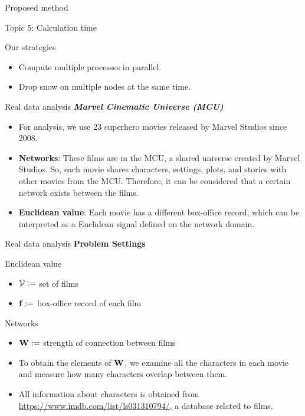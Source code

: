 \documentclass[
  ignorenonframetext,
]{beamer}
\providecommand{\tightlist}{%
  \setlength{\itemsep}{0pt}\setlength{\parskip}{0pt}}\usepackage{longtable,booktabs,array}
\begin{document}
\begin{frame}{Proposed method}
\label{proposed-method-6}
\begin{block}{Topic 5: Calculation time}
\label{topic-5-calculation-time}
\begin{block}{Our strategies}
\label{our-strategies-2}
\begin{itemize}
\tightlist
\item
  Compute multiple processes in parallel.
\item
  Drop snow on multiple nodes at the same time.
\end{itemize}
\end{block}
\end{block}
\end{frame}

\begin{frame}{Real data analysis}
\label{real-data-analysis}
\textbf{\emph{Marvel Cinematic Universe (MCU)}}

\begin{itemize}
\tightlist
\item
  For analysis, we use 23 superhero movies released by Marvel Studios
  since 2008.
\item
  \textbf{Networks}: These films are in the MCU, a shared universe
  created by Marvel Studios. So, each movie shares characters, settings,
  plots, and stories with other movies from the MCU. Therefore, it can
  be considered that a certain network exists between the films.
\item
  \textbf{Euclidean value}: Each movie has a different box-office
  record, which can be interpreted as a Euclidean signal defined on the
  network domain.
\end{itemize}
\end{frame}

\begin{frame}{Real data analysis}
\label{real-data-analysis-1}
\textbf{Problem Settings}

\begin{block}{Euclidean value}
\begin{itemize}
\tightlist
\item
  \({\cal V}:=\) set of films
\item
  \({\bf f}:=\) box-office record of each film
\end{itemize}
\end{block}

\begin{block}{Networks}
\begin{itemize}
\item
  \({\bf W}:=\) strength of connection between films
\item
  To obtain the elements of \(\bf W\), we examine all the characters in
  each movie and measure how many characters overlap between them.
\item
  All information about characters is obtained from
  \url{https://www.imdb.com/list/ls031310794/}, a database related to
  films.
\end{itemize}
\end{block}
\end{frame}
\end{document}
